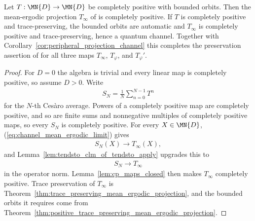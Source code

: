 \begin{corollary}
    \label{cor:mean_ergodic_projection_channel}
    \leanok
    Let $T:\MN{D}\to\MN{D}$ be completely positive with bounded orbits. Then
    the mean-ergodic projection $T_\infty$ of
    \cite[Equation~(6.14)]{Wolf2012Quantum} is completely positive. If $T$ is
    completely positive and trace-preserving, the bounded orbits are automatic
    and $T_\infty$ is completely positive and trace-preserving, hence a
    quantum channel. Together with
    Corollary~\ref{cor:peripheral_projection_channel} this completes the
    preservation assertion of \cite[Proposition~6.3]{Wolf2012Quantum} for all
    three maps $T_\infty$, $T_\varphi$, and $T_\varphi'$.
\end{corollary}

\begin{proof}\leanok
    For $D=0$ the algebra is trivial and every linear map is completely
    positive, so assume $D>0$. Write
    \begin{align}
        S_N=\frac{1}{N}\sum_{n=0}^{N-1}T^n
    \end{align}
    for the $N$-th Ces\`aro average. Powers of a completely positive map are
    completely positive, and so are finite sums and nonnegative multiples of
    completely positive maps, so every $S_N$ is completely positive. For every
    $X\in\MN{D}$, (\ref{eq:channel_mean_ergodic_limit}) gives
    \begin{align}
        S_N(X)\longrightarrow T_\infty(X),
    \end{align}
    and Lemma~\ref{lem:tendsto_clm_of_tendsto_apply} upgrades this to
    \begin{align}
        S_N\longrightarrow T_\infty
    \end{align}
    in the operator norm. Lemma~\ref{lem:cp_maps_closed} then makes $T_\infty$
    completely positive. Trace preservation of $T_\infty$ is
    Theorem~\ref{thm:trace_preserving_mean_ergodic_projection}, and the
    bounded orbits it requires come from
    Theorem~\ref{thm:positive_trace_preserving_mean_ergodic_projection}.
\end{proof}

